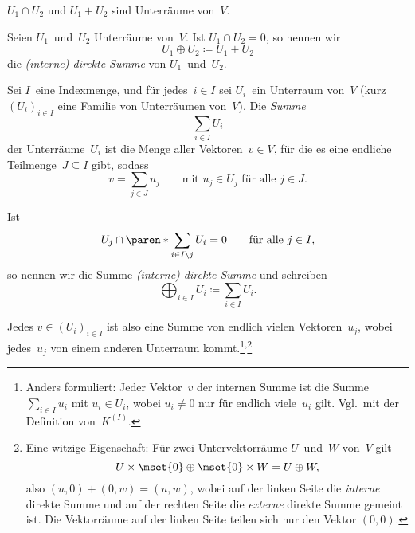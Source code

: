 \documentclass[a4paper]{article}
\begin{document}
\begin{lemma}
    $U_1 \cap U_2$ und $U_1+U_2$ sind Unterräume von~$V$.
\end{lemma}

\begin{definition}
    Seien $U_1$~und~$U_2$ Unterräume von~$V$. Ist $U_1 \cap U_2 = 0$, so nennen wir
    \begin{equation*}
        U_1\oplus U_2 \coloneqq U_1+U_2
    \end{equation*}
    die \emph{(interne) direkte Summe} von $U_1$~und~$U_2$.
\end{definition}

\begin{definition}
    Sei $I$~eine Indexmenge, und für jedes~$i \in I$ sei $U_i$~ein Unterraum von~$V$ (kurz $(U_i)_{i\in I}$ eine Familie von Unterräumen von~$V$). Die \emph{Summe}
    \begin{equation*}
        \sum_{i\in I} U_i
    \end{equation*}
    der Unterräume~$U_i$ ist die Menge aller Vektoren~$v \in V$, für die es eine endliche Teilmenge~$J \subseteq I$ gibt, sodass
    \begin{equation*}
        v = \sum_{j\in J} u_j \qquad\text{mit } u_j \in U_j \text{ für alle } j \in J.
    \end{equation*}

    Ist
    \begin{equation*}
        U_j \cap \paren*{\sum_{i\in I\setminus{j}} U_i} = 0 \qquad\text{für alle } j \in I,
    \end{equation*}
    so nennen wir die Summe \emph{(interne) direkte Summe} und schreiben
    \begin{equation*}
        \bigoplus_{i\in I} U_i \coloneqq \sum_{i\in I} U_i.
    \end{equation*}
\end{definition}

Jedes $v \in (U_i)_{i\in I}$ ist also eine Summe von endlich vielen Vektoren~$u_j$, wobei jedes~$u_j$ von einem anderen Unterraum kommt.\footnote{Anders formuliert: Jeder Vektor~$v$ der internen Summe ist die Summe $\sum_{i\in I} u_i$ mit $u_i \in U_i$, wobei $u_i \neq 0$ nur für endlich viele~$u_i$ gilt. Vgl.\ mit der Definition von~$K^{(I)}$.}\textsuperscript{,}\footnote{Eine witzige Eigenschaft: Für zwei Untervektorräume $U$~und~$W$ von~$V$ gilt
\begin{equation*}
    U\times\mset{0} \oplus \mset{0}\times W = U \oplus W,
\end{equation*}
also $(u, 0) + (0,w) = (u,w)$, wobei auf der linken Seite die \emph{interne} direkte Summe und auf der rechten Seite die \emph{externe} direkte Summe gemeint ist. Die Vektorräume auf der linken Seite teilen sich nur den Vektor $(0, 0)$.}
\end{document}
